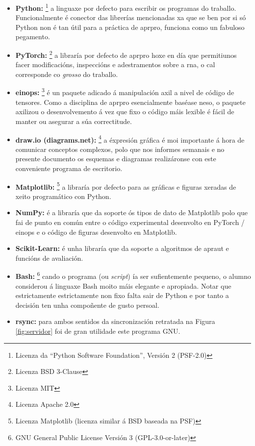 \begin{itemize}
				\item \textbf{Python:} \footnote{Licenza da ``Python Software Foundation'', Versión 2 (PSF-2.0)\label{fn:psf}} a linguaxe por defecto para escribir os programas do traballo. Funcionalmente é conector das librerías mencionadas xa que se ben por si só Python non é tan útil para a práctica de \acrshort{aprpro}, funciona como un fabuloso pegamento.
				\item \textbf{PyTorch:} \footnote{Licenza BSD 3-Clause\label{fn:bsd3}} a libraría por defecto de \acrshort{aprpro} hoxe en día que permitiunos facer modificacións, inspeccións e adestramentos sobre a \acrshort{rna}, o cal corresponde co \emph{grosso} do traballo.
				\item \textbf{einops:} \footnote{Licenza MIT\label{fn:mit}} é un paquete adicado á manipulación axil a nivel de código de tensores. Como a disciplina de \acrshort{aprpro} esencialmente baséase neso, o paquete axilizou o desenvolvemento á vez que fixo o código máis lexible é fácil de manter ou asegurar a súa correctitude.
    		\item \textbf{draw.io (diagrams.net):} \footnote{Licenza Apache 2.0\label{fn:apache}} a éxpresión gráfica é moi importante á hora de comunicar conceptos complexos, polo que nos informes semanais e no presente documento os esquemas e diagramas realizáronse con este conveniente programa de escritorio.
    		\item \textbf{Matplotlib:} \footnote{Licenza Matplotlib (licenza similar á BSD baseada na PSF)\label{fn:mpl}} a libraría por defecto para as gráficas e figuras xeradas de xeito programático con Python.
    		\item \textbf{NumPy:}  é a libraría que da soporte ós tipos de dato de Matplotlib polo que fai de punto en común entre o código experimental desenvolto en PyTorch / einops e o código de figuras desenvolto en Matplotlib.
				\item \textbf{Scikit-Learn:}  é unha libraría que da soporte a algoritmos de \acrshort{apraut} e funcións de avaliación.
				\item \textbf{Bash:} \footnote{GNU General Public License Versión 3 (GPL-3.0-or-later)\label{fn:gpl3}} cando o programa (ou \emph{script}) ía ser sufientemente pequeno, o alumno considerou á linguaxe Bash moito máis elegante e apropiada. Notar que estrictamente estrictamente non fixo falta sair de Python e por tanto a decisión ten unha compoñente de gusto persoal.
				\item \textbf{rsync:}  para ambos sentidos da sincronización retratada na Figura \ref{fig:servidor} foi de gran utilidade este programa GNU.

\end{itemize}
